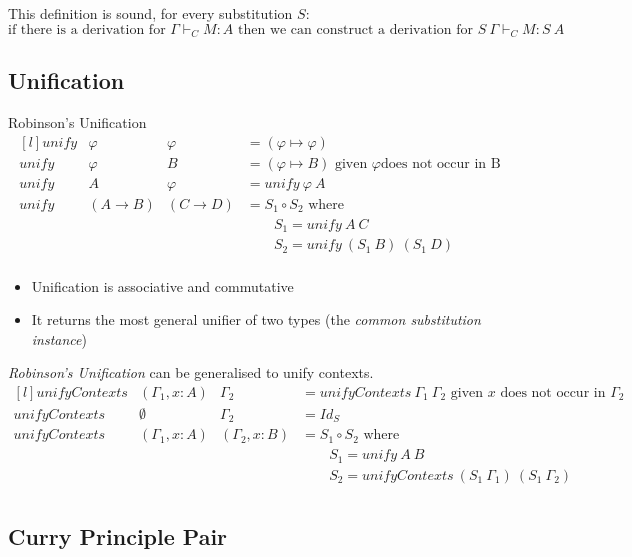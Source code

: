 This definition is sound, for every substitution $S$:
\[\text{if there is a derivation for } \Gamma \vdash_C M : A \text{ then we can  construct a derivation for } S \ \Gamma \vdash_C M : S \ A\]


\subsection{Unification}

\begin{definitionbox}{Robinson's Unification}
	\[\begin{matrix*}[l]
			unify & \varphi & \varphi & = (\varphi \mapsto \varphi) \\
			unify & \varphi & B & = (\varphi \mapsto B)  \text{ given } \varphi \text{does not occur in B} \\
			unify & A & \varphi & = unify \ \varphi \ A \\
			unify &(A \to B) & (C \to D) & = S_1 \circ S_2 \text{ where} \\
			& & & \qquad S_1 = unify \ A \ C \\
			& & & \qquad S_2 = unify \ (S_1 \ B) \ (S_1 \ D)\\
		\end{matrix*}\]
	\begin{itemize}
		\item Unification is associative and commutative
		\item It returns the most general unifier of two types (the \textit{common substitution instance})
	\end{itemize}
\end{definitionbox}

\textit{Robinson's Unification} can be generalised to unify contexts.
\[\begin{matrix*}[l]
		unifyContexts & (\Gamma_1, x:A) & \Gamma_2 & = unifyContexts \ \Gamma_1 \ \Gamma_2 \text{ given }x \text{ does not occur in } \Gamma_2 \\
		unifyContexts & \emptyset & \Gamma_2 & = Id_S \\
		unifyContexts & (\Gamma_1, x:A) & (\Gamma_2, x:B) & = S_1 \circ S_2 \text{ where}\\
		& & & \qquad S_1 = unify \ A \ B \\
		& & & \qquad S_2 = unifyContexts \ (S_1 \ \Gamma_1) \ (S_1 \ \Gamma_2) \\
	\end{matrix*}\]

\subsection{Curry Principle Pair}

